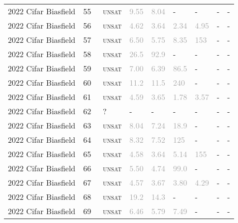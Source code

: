 \begin{center}
{\begin{longtable}{@{}lllllllll@{}}
2022 Cifar Biasfield & 55 & ~\textsc{unsat} & \textcolor{darkgray}{9.55} & \textcolor{darkgray}{8.04} & - & - & - & - \\
2022 Cifar Biasfield & 56 & ~\textsc{unsat} & \textcolor{darkgray}{4.62} & \textcolor{darkgray}{3.64} & \textcolor{darkgray}{2.34} & \textcolor{darkgray}{4.95} & - & - \\
2022 Cifar Biasfield & 57 & ~\textsc{unsat} & \textcolor{darkgray}{6.50} & \textcolor{darkgray}{5.75} & \textcolor{darkgray}{8.35} & \textcolor{darkgray}{153} & - & - \\
2022 Cifar Biasfield & 58 & ~\textsc{unsat} & \textcolor{darkgray}{26.5} & \textcolor{darkgray}{92.9} & - & - & - & - \\
2022 Cifar Biasfield & 59 & ~\textsc{unsat} & \textcolor{darkgray}{7.00} & \textcolor{darkgray}{6.39} & \textcolor{darkgray}{86.5} & - & - & - \\
2022 Cifar Biasfield & 60 & ~\textsc{unsat} & \textcolor{darkgray}{11.2} & \textcolor{darkgray}{11.5} & \textcolor{darkgray}{240} & - & - & - \\
2022 Cifar Biasfield & 61 & ~\textsc{unsat} & \textcolor{darkgray}{4.59} & \textcolor{darkgray}{3.65} & \textcolor{darkgray}{1.78} & \textcolor{darkgray}{3.57} & - & - \\
2022 Cifar Biasfield & 62 & ~? & - & - & - & - & - & - \\
2022 Cifar Biasfield & 63 & ~\textsc{unsat} & \textcolor{darkgray}{8.04} & \textcolor{darkgray}{7.24} & \textcolor{darkgray}{18.9} & - & - & - \\
2022 Cifar Biasfield & 64 & ~\textsc{unsat} & \textcolor{darkgray}{8.32} & \textcolor{darkgray}{7.52} & \textcolor{darkgray}{125} & - & - & - \\
2022 Cifar Biasfield & 65 & ~\textsc{unsat} & \textcolor{darkgray}{4.58} & \textcolor{darkgray}{3.64} & \textcolor{darkgray}{5.14} & \textcolor{darkgray}{155} & - & - \\
2022 Cifar Biasfield & 66 & ~\textsc{unsat} & \textcolor{darkgray}{5.50} & \textcolor{darkgray}{4.74} & \textcolor{darkgray}{99.0} & - & - & - \\
2022 Cifar Biasfield & 67 & ~\textsc{unsat} & \textcolor{darkgray}{4.57} & \textcolor{darkgray}{3.67} & \textcolor{darkgray}{3.80} & \textcolor{darkgray}{4.29} & - & - \\
2022 Cifar Biasfield & 68 & ~\textsc{unsat} & \textcolor{darkgray}{19.2} & \textcolor{darkgray}{14.3} & - & - & - & - \\
2022 Cifar Biasfield & 69 & ~\textsc{unsat} & \textcolor{darkgray}{6.46} & \textcolor{darkgray}{5.79} & \textcolor{darkgray}{7.49} & - & - & - \\

\end{longtable}}
\end{center}
